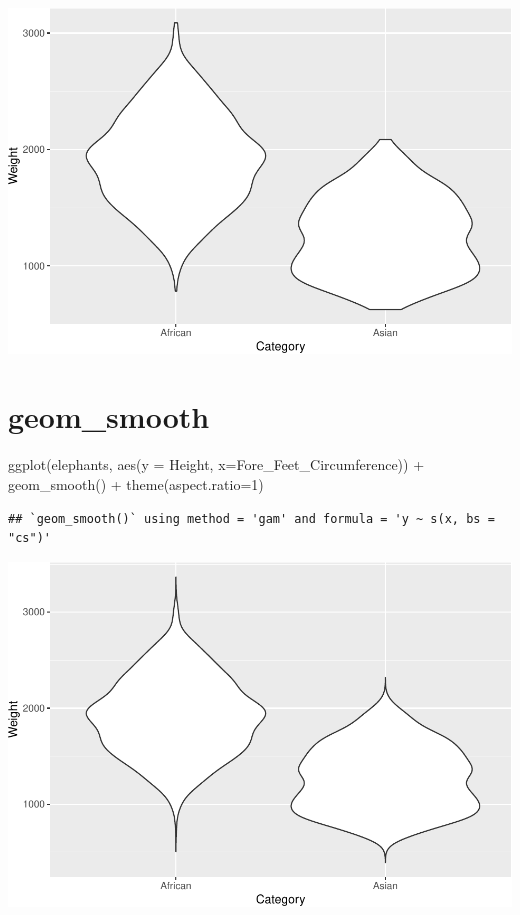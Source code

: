 \documentclass[
]{book}
\newenvironment{Shaded}{\begin{snugshade}}{\end{snugshade}}
\newcommand{\AttributeTok}[1]{\textcolor[rgb]{0.77,0.63,0.00}{#1}}
\newcommand{\DecValTok}[1]{\textcolor[rgb]{0.00,0.00,0.81}{#1}}
\newcommand{\FunctionTok}[1]{\textcolor[rgb]{0.00,0.00,0.00}{#1}}
\newcommand{\NormalTok}[1]{#1}
\newcommand{\SpecialCharTok}[1]{\textcolor[rgb]{0.00,0.00,0.00}{#1}}
\begin{document}
\includegraphics{Data-Visualisation-geom-Encyclopedia_files/figure-latex/unnamed-chunk-51-1.pdf}

\hypertarget{smooth}{%
\section{geom\_smooth}\label{smooth}}

\begin{Shaded}
\begin{Highlighting}[]
\FunctionTok{ggplot}\NormalTok{(elephants, }\FunctionTok{aes}\NormalTok{(}\AttributeTok{y =}\NormalTok{ Height, }\AttributeTok{x=}\NormalTok{Fore\_Feet\_Circumference)) }\SpecialCharTok{+} 
  \FunctionTok{geom\_smooth}\NormalTok{() }\SpecialCharTok{+} \FunctionTok{theme}\NormalTok{(}\AttributeTok{aspect.ratio=}\DecValTok{1}\NormalTok{)}
\end{Highlighting}
\end{Shaded}

\begin{verbatim}
## `geom_smooth()` using method = 'gam' and formula = 'y ~ s(x, bs = "cs")'
\end{verbatim}

\includegraphics{Data-Visualisation-geom-Encyclopedia_files/figure-latex/unnamed-chunk-52-1.pdf}
\end{document}
